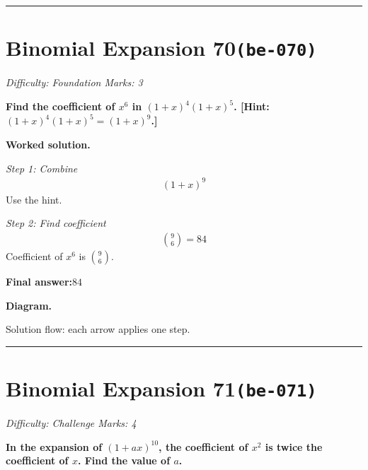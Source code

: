 \documentclass[11pt]{article}
\newcommand{\question}[1]{\par\medskip\noindent\textbf{#1}\par}
\begin{document}
\medskip\hrule

\section*{Binomial Expansion 70\quad\small\texttt{(be-070)}}
\textit{Difficulty: Foundation \quad\textbar\quad Marks: 3}

\question{Find the coefficient of \( x^6 \) in \( (1 + x)^4(1 + x)^5 \). [Hint: \( (1+x)^4(1+x)^5 = (1+x)^9 \).]}

\textbf{Worked solution.}

\textit{Step 1: Combine}
\[\begin{gathered}
(1+x)^9
\end{gathered}\]
Use the hint.

\textit{Step 2: Find coefficient}
\[\begin{gathered}
\binom{9}{6} = 84
\end{gathered}\]
Coefficient of \( x^6 \) is \( \binom{9}{6} \).

\begin{answerbox}
\textbf{Final answer:}\quad \(\displaystyle 84\)
\end{answerbox}
\textbf{Diagram.}

\begin{center}
\end{center}
\small Solution flow: each arrow applies one step.\normalsize

\medskip\hrule

\section*{Binomial Expansion 71\quad\small\texttt{(be-071)}}
\textit{Difficulty: Challenge \quad\textbar\quad Marks: 4}

\question{In the expansion of \( (1 + ax)^{10} \), the coefficient of \( x^2 \) is twice the coefficient of \( x \). Find the value of \( a \).}
\end{document}
